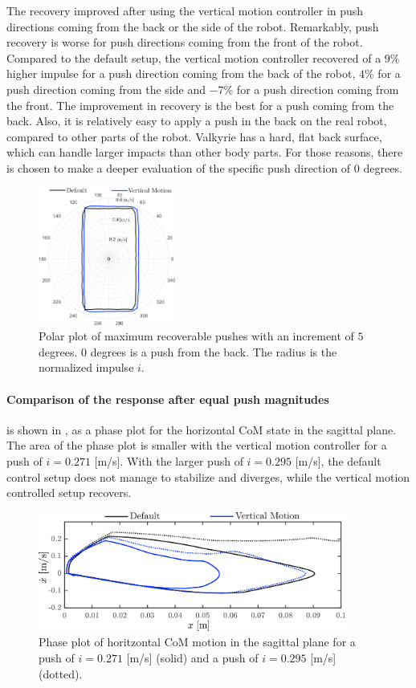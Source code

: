The recovery improved after using the vertical motion controller in push directions coming from the back or the side of the robot. Remarkably, push recovery is worse for push directions coming from the front of the robot. Compared to the default setup, the vertical motion controller recovered of a $9$\% higher impulse for a push direction coming from the back of the robot, $4$\% for a push direction coming from the side and $-7$\% for a push direction coming from the front. The improvement in recovery is the best for a push coming from the back. Also, it is relatively easy to apply a push in the back on the real robot, compared to other parts of the robot. Valkyrie has a hard, flat back surface, which can handle larger impacts than other body parts. For those reasons, there is chosen to make a deeper evaluation of the specific push direction of $0$ degrees.
\begin{figure}
\centering
\includegraphics[width=0.4\textwidth]{STYLESTUFF/roundStanding.png}
\caption{Polar plot of maximum recoverable pushes with an increment of $5$ degrees. $0$ degrees is a push from the back. The radius is the normalized impulse $i$. }
\label{fig:roundStanding}
\end{figure}

\paragraph{Comparison of the response after equal push magnitudes} is shown in , as a phase plot for the horizontal \ac{CoM} state in the sagittal plane. The area of the phase plot is smaller with the vertical motion controller for a push of $i=0.271$ [m/s]. With the larger push of $i=0.295$ [m/s], the default control setup does not manage to stabilize and diverges, while the vertical motion controlled setup recovers.
\begin{figure}
\centering
\includegraphics[width=0.9\textwidth]{STYLESTUFF/valcomparephase.png}
\caption{Phase plot of horitzontal \ac{CoM} motion in the sagittal plane for a push of $i=0.271$ [m/s] (solid) and a push of $i=0.295$ [m/s] (dotted).}
\label{fig:valcomparephase}
\end{figure}

